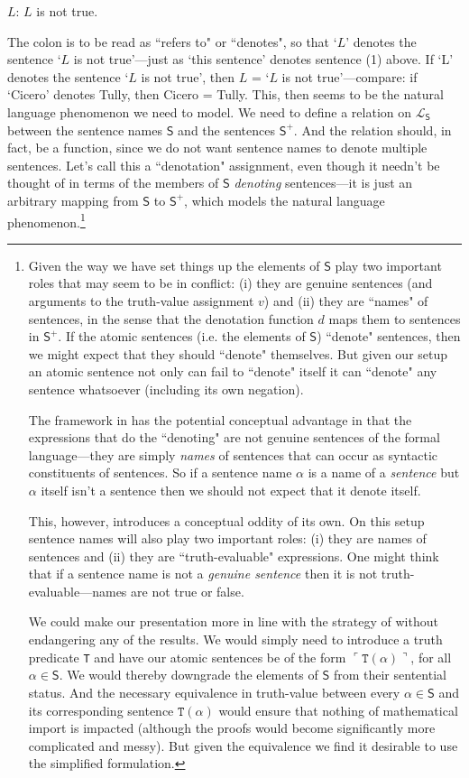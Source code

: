 \documentclass[12pt]{kluwer}
\theoremstyle{remark}
\newcommand{\prg}{\hspace{0.25in}}
\newcommand{\fancy}[1]{\mathcal{#1}}
\def\S{\textsf{S}}
\def\L{\fancy{L}}
\begin{document}
\begin{center}
 $L$: $L$ is not true.\\
 \end{center}
 The colon is to be read as ``refers to" or ``denotes", so that `$L$' denotes the sentence `$L$ is not true'---just as `this sentence' denotes sentence (1) above. If `L' denotes the sentence `$L$ is not true', then $L$ = `$L$ is not true'---compare: if `Cicero' denotes Tully, then Cicero = Tully. This, then seems to be the natural language phenomenon we need to model. We need to define a relation on $\L_\S$ between the sentence names $\S$ and the sentences $\S^{+}$. And the relation should, in fact, be a function, since we do not want sentence names to denote multiple sentences. Let's call this a ``denotation" assignment, even though it needn't be thought of in terms of the members of $\S$ \textit{denoting} sentences---it is just an arbitrary mapping from $\S$ to $\S^{+}$, which models the natural language phenomenon.\footnote{Given the way we have set things up the elements of $\S$ play two important roles that may seem to be in conflict: (i) they are genuine sentences (and arguments to the truth-value assignment $v$) and (ii) they are ``names" of sentences, in the sense that the denotation function $d$ maps them to sentences in $\S^+$. If the atomic sentences (i.e. the elements of $\S$) ``denote" sentences, then we might expect that they should ``denote" themselves. But given our setup an atomic sentence not only can fail to ``denote" itself it can ``denote" any sentence whatsoever (including its own negation).

\prg The framework in \cite{cook} has the potential conceptual advantage in that the expressions that do the ``denoting" are not genuine sentences of the formal language---they are simply \textit{names} of sentences that can occur as syntactic constituents of sentences. So if a sentence name $\alpha$ is a name of a \textit{sentence} but $\alpha$ itself isn't a sentence then we should not expect that it denote itself. 

\prg This, however, introduces a conceptual oddity of its own. On this setup sentence names will also play two important roles: (i) they are names of sentences and (ii) they are ``truth-evaluable" expressions. One might think that if a sentence name is not a \textit{genuine sentence} then it is not truth-evaluable---names are not true or false. 

\prg We could make our presentation more in line with the strategy of \cite{cook} without endangering any of the results. We would simply need to introduce a truth predicate \texttt{T} and have our atomic sentences be of the form $\ulcorner\texttt{T}(\alpha)\urcorner$, for all $\alpha \in \S$. We would thereby downgrade the elements of $\S$ from their sentential status. And the necessary equivalence in truth-value between every $\alpha\in \S$ and its corresponding sentence $\texttt{T}(\alpha)$ would ensure that nothing of mathematical import is impacted (although the proofs would become significantly more complicated and messy). But given the equivalence we find it desirable to use the simplified formulation.}
\end{document}
